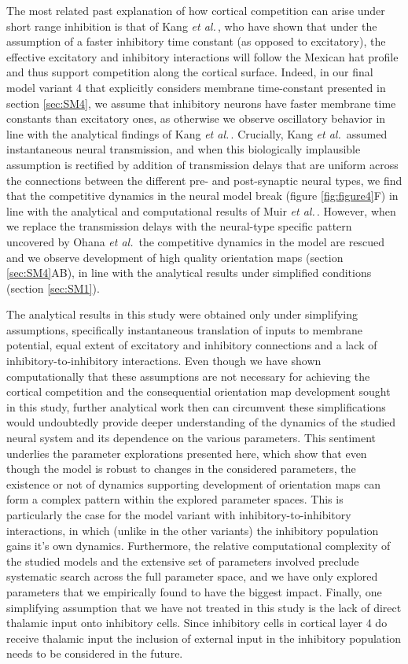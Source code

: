 \documentclass[utf8]{frontiersSCNS}
\newcommand{\etal}{\textit{et al.}}
\begin{document}
The most related past explanation of how cortical competition can arise under short range inhibition is that of Kang \etal\,\citep{Kang2003}, who have shown 
that under the assumption of a faster inhibitory time constant (as opposed to excitatory), the effective excitatory and inhibitory interactions will follow the 
Mexican hat profile and thus support competition along the cortical surface. Indeed, in our final model variant 4 that explicitly considers membrane time-constant presented in section \ref{sec:SM4}, 
we assume that inhibitory neurons have faster membrane time constants than excitatory ones, as otherwise we observe oscillatory behavior in line with the analytical findings of Kang \etal\,\citep{Kang2003}. 
Crucially, Kang \etal\,\citep{Kang2003} assumed instantaneous neural transmission, and when this biologically implausible assumption is rectified by addition of transmission delays that are uniform 
across the connections between the different pre- and post-synaptic neural types, we find that the competitive dynamics in the neural model break (figure \ref{fig:figure4}F) in line with the analytical and 
computational results of Muir \etal\,\citep{Muir2014}. However, when we replace the transmission delays with the neural-type specific  pattern uncovered by Ohana \etal\,\citep{Ohana2012} the competitive dynamics 
in the model are rescued and we observe development of high quality orientation maps (section \ref{sec:SM4}AB), in line with the analytical results under simplified conditions (section \ref{sec:SM1}).

The analytical results in this study were obtained only under simplifying assumptions, specifically instantaneous translation of inputs to membrane potential, equal extent of 
excitatory and inhibitory connections and a lack of inhibitory-to-inhibitory interactions. Even though we have shown computationally that these assumptions are not necessary 
for achieving the cortical competition and the consequential orientation map development sought in this study, further analytical work then can circumvent these simplifications would 
undoubtedly provide deeper understanding of the dynamics of the studied neural system and its dependence on the various parameters. This sentiment underlies the parameter 
explorations presented here, which show that even though the model is robust to changes in the considered parameters, the existence or not of dynamics supporting development of 
orientation maps can form a complex pattern within the explored parameter spaces. This is particularly the case for the model variant with inhibitory-to-inhibitory interactions, in which 
(unlike in the other variants) the inhibitory population gains it's own dynamics. Furthermore, the relative computational complexity of the studied models and the extensive set of parameters
involved preclude systematic search across the full parameter space, and we have only explored parameters that we empirically found to have the biggest impact. Finally, one simplifying assumption 
that we have not treated in this study is the lack of direct thalamic input onto inhibitory cells. Since inhibitory cells in cortical layer 4 do receive thalamic input \citep{Binzegger2004} the 
inclusion of external input in the inhibitory population needs to be considered in the future.
\end{document}
